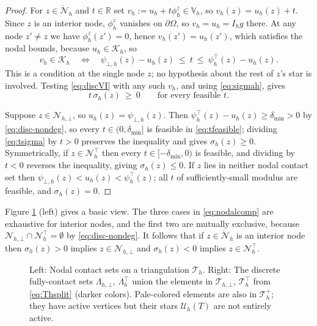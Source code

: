 \documentclass[12pt]{amsart}
\numberwithin{equation}{section}
\theoremstyle{plain}
\theoremstyle{definition}
\theoremstyle{remark}
\newcommand{\dOm}{\partial\Omega}
\newcommand{\psiloh}{\psi_{\bot,h}}
\newcommand{\psiuph}{\psi^\top_h}
\newcommand{\Th}{\mathcal{T}_h}
\newcommand{\Vh}{\mathbb{V}_h}
\newcommand{\Nh}{\mathcal{N}_h}
\newcommand{\Nhr}{\mathring{\mathcal{N}}_h}
\newcommand{\Ih}{I_h}
\newcommand{\Uh}{\mathcal{U}_h}
\newcommand{\Kh}{\mathcal{K}_h}
\newcommand{\Thbot}{\mathcal{T}_{h,\bot}}
\newcommand{\Thtop}{\Th^\top}
\newcommand{\Thplus}{\Th^+}
\newcommand{\Nhbot}{\mathcal{N}_{h,\bot}}
\newcommand{\Nhtop}{\Nh^\top}
\newcommand{\Lamhbot}{\Lambda_{h,\bot}}
\newcommand{\Lamhtop}{\Lambda_h^\top}
\begin{document}
\begin{proof}
For $z\in \Nhr$ and $t \in \mathbb{R}$ set $v_h := u_h + t \phi_h^z \in \Vh$, so $v_h(z)=u_h(z)+t$.  Since $z$ is an interior node, $\phi_h^z$ vanishes on $\dOm$, so $v_h = u_h = \Ih g$ there.  At any node $z' \ne z$ we have $\phi_h^z(z') = 0$, hence $v_h(z') = u_h(z')$, which satisfies the nodal bounds, because $u_h \in \Kh$, so
\begin{equation}
\label{eq:tfeasible}
  v_h \in \Kh \quad\iff\quad \psiloh(z) - u_h(z) \ \le\ t \ \le\ \psiuph(z) - u_h(z).
\end{equation}
This is a condition at the single node $z$; no hypothesis about the rest of $z$'s star is involved.  Testing \eqref{eq:discVI} with any such $v_h$, and using \eqref{eq:sigmah}, gives
\begin{equation}
\label{eq:tsigma}
  t\,\sigma_h(z) \ \ge\ 0 \qquad \text{for every feasible } t.
\end{equation}

Suppose $z \in \Nhbot$, so $u_h(z) = \psiloh(z)$.  Then $\psiuph(z) - u_h(z) \ge \delta_{\min} > 0$ by \eqref{eq:disc-nondeg}, so every $t \in (0,\delta_{\min}]$ is feasible in \eqref{eq:tfeasible}; dividing \eqref{eq:tsigma} by $t > 0$ preserves the inequality and gives $\sigma_h(z) \ge 0$.  Symmetrically, if $z \in \Nhtop$ then every $t \in [-\delta_{\min},0)$ is feasible, and dividing by $t < 0$ reverses the inequality, giving $\sigma_h(z) \le 0$.  If $z$ lies in neither nodal contact set then $\psiloh(z) < u_h(z) < \psiuph(z)$; all $t$ of sufficiently-small modulus are feasible, and $\sigma_h(z) = 0$.
\end{proof}

Figure \ref{fig:nodalelem} (left) gives a basic view.  The three cases in \eqref{eq:nodalcomp} are exhaustive for interior nodes, and the first two are mutually exclusive, because $\Nhbot \cap \Nhtop = \emptyset$ by \eqref{eq:disc-nondeg}.  It follows that if $z \in \Nhr$ is an interior node then $\sigma_h(z) > 0$ implies $z \in \Nhbot$ and $\sigma_h(z) < 0$ implies $z \in \Nhtop$.

\begin{figure}[ht]
\centering

\caption{Left: Nodal contact sets on a triangulation $\Th$.  Right: The discrete fully-contact sets $\Lamhbot$, $\Lamhtop$ union the elements in $\Thbot$, $\Thtop$ from \eqref{eq:Thsplit} (darker colors).  Pale-colored elements are also in $\Thplus$; they have active vertices but their stars $\Uh(T)$ are not entirely active.}
\label{fig:nodalelem}
\end{figure}
\end{document}

